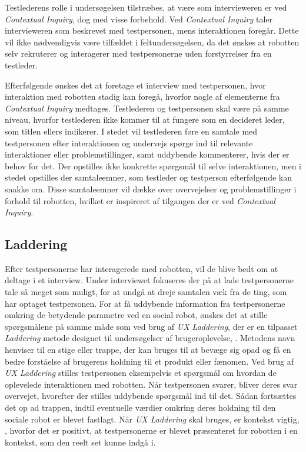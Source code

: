Testlederens rolle i undersøgelsen tilstræbes, at være som intervieweren er ved \textit{Contextual Inquiry}, dog med visse forbehold. Ved \textit{Contextual Inquiry} taler intervieweren som beskrevet med testpersonen, mens interaktionen foregår. Dette vil ikke nødvendigvis være tilfældet i feltundersøgelsen, da det ønskes at robotten selv rekruterer og interagerer med testpersonerne uden forstyrrelser fra en testleder. 

Efterfølgende ønskes det at foretage et interview med testpersonen, hvor interaktion med robotten stadig kan foregå, hvorfor nogle af elementerne fra \textit{Contextual Inquiry} medtages. Testlederen og testpersonen skal være på samme niveau, hvorfor testlederen ikke kommer til at fungere som en decideret leder, som titlen ellers indikerer. I stedet vil testlederen føre en samtale med testpersonen efter interaktionen og undervejs spørge ind til relevante interaktioner eller problemstillinger, samt uddybende kommenterer, hvis der er behov for det. Der opstilles ikke konkrette spørgsmål til selve interaktionen, men i stedet opstilles der samtaleemner, som testleder og testperson efterfølgende kan snakke om. Disse samtaleemner vil dække over overvejelser og problemstillinger i forhold til robotten, hvilket er inspireret af tilgangen der er ved \textit{Contextual Inquiry}.
%
\subsection{Laddering}
\label{ParametreLaddering}
%
Efter testpersonerne har interagerede med robotten, vil de blive bedt om at deltage i et interview. Under interviewet fokuseres der på at lade testpersonerne tale så meget som muligt, for at undgå at dreje samtalen væk fra de ting, som har optaget testpersonen. For at få uddybende information fra testpersonerne omkring de betydende parametre ved en social robot, ønskes det at stille spørgsmålene på samme måde som ved brug af \textit{UX Laddering}, der er en tilpasset \textit{Laddering} metode designet til undersøgelser af brugeroplevelse, \parencite[ss. 3-4]{PDF:LadderingTheUserExperience}. Metodens navn henviser til en stige eller trappe, der kan bruges til at bevæge sig opad og få en bedre forståelse af brugerens holdning til et produkt eller fænomen. Ved brug af \textit{UX Laddering} stilles testpersonen eksempelvis et spørgsmål om hvordan de oplevelede interaktionen med robotten. Når testpersonen svarer, bliver deres svar overvejet, hvorefter der stilles uddybende spørgsmål ind til det. Sådan fortsættes det op ad trappen, indtil eventuelle værdier omkring deres holdning til den sociale robot er blevet fastlagt. Når \textit{UX Laddering} skal bruges, er kontekst vigtig, \parencite[s. 3]{PDF:LadderingTheUserExperience}, hvorfor det er positivt, at testpersonerne er blevet præsenteret for robotten i en kontekst, som den reelt set kunne indgå i. 

